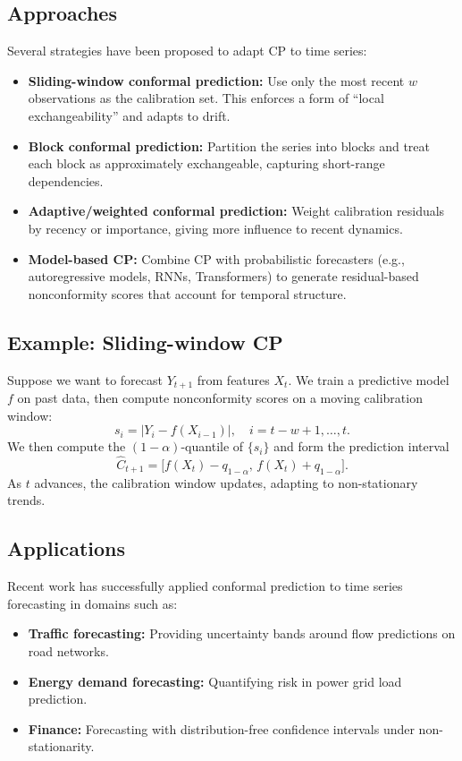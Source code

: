 \documentclass[11pt]{article}
\theoremstyle{remark}
\begin{document}
\subsection*{Approaches}
Several strategies have been proposed to adapt CP to time series:
\begin{itemize}
    \item \textbf{Sliding-window conformal prediction:} Use only the most recent $w$ observations as the calibration set. This enforces a form of ``local exchangeability'' and adapts to drift.
    \item \textbf{Block conformal prediction:} Partition the series into blocks and treat each block as approximately exchangeable, capturing short-range dependencies.
    \item \textbf{Adaptive/weighted conformal prediction:} Weight calibration residuals by recency or importance, giving more influence to recent dynamics.
    \item \textbf{Model-based CP:} Combine CP with probabilistic forecasters (e.g., autoregressive models, RNNs, Transformers) to generate residual-based nonconformity scores that account for temporal structure.
\end{itemize}

\subsection*{Example: Sliding-window CP}
Suppose we want to forecast $Y_{t+1}$ from features $X_t$.
We train a predictive model $f$ on past data, then compute nonconformity scores on a moving calibration window:
\[
s_i = |Y_i - f(X_{i-1})|, \quad i = t-w+1, \dots, t.
\]
We then compute the $(1-\alpha)$-quantile of $\{s_i\}$ and form the prediction interval
\[
\hat{C}_{t+1} = \big[ f(X_t) - q_{1-\alpha}, \, f(X_t) + q_{1-\alpha} \big].
\]
As $t$ advances, the calibration window updates, adapting to non-stationary trends.

\subsection*{Applications}
Recent work has successfully applied conformal prediction to time series forecasting in domains such as:
\begin{itemize}
    \item \textbf{Traffic forecasting:} Providing uncertainty bands around flow predictions on road networks.
    \item \textbf{Energy demand forecasting:} Quantifying risk in power grid load prediction.
    \item \textbf{Finance:} Forecasting with distribution-free confidence intervals under non-stationarity.
\end{itemize}
\end{document}
